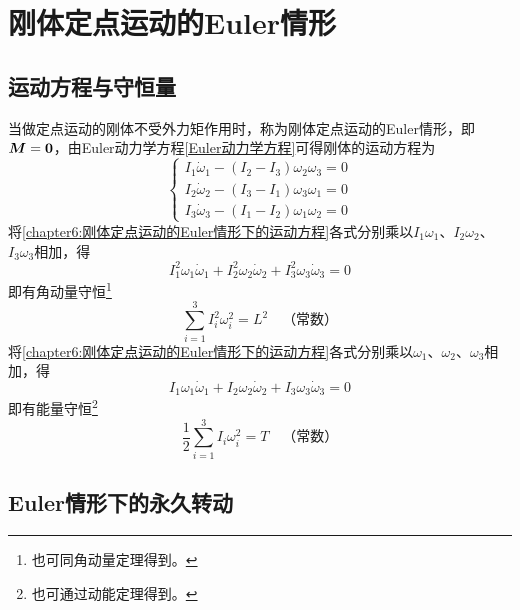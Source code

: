 \section{刚体定点运动的Euler情形}\label{chapter6:section-刚体定点运动的Euler情形}

\subsection{运动方程与守恒量}

当做定点运动的刚体不受外力矩作用时，称为刚体定点运动的{\heiti Euler情形}，即$\boldsymbol{M} = \boldsymbol{0}$，由Euler动力学方程\eqref{Euler动力学方程}可得刚体的运动方程为
\begin{equation}
	\begin{cases}
		I_1 \dot{\omega}_1 - (I_2-I_3)\omega_2 \omega_3 = 0 \\
		I_2 \dot{\omega}_2 - (I_3-I_1)\omega_3 \omega_1 = 0 \\
		I_3 \dot{\omega}_3 - (I_1-I_2)\omega_1 \omega_2 = 0
	\end{cases}
	\label{chapter6:刚体定点运动的Euler情形下的运动方程}
\end{equation}
将\eqref{chapter6:刚体定点运动的Euler情形下的运动方程}各式分别乘以$I_1\omega_1$、$I_2\omega_2$、$I_3\omega_3$相加，得
\begin{equation*}
	I_1^2 \omega_1 \dot{\omega}_1 + I_2^2 \omega_2 \dot{\omega}_2 + I_3^2 \omega_3 \dot{\omega}_3 = 0
\end{equation*}
即有角动量守恒\footnote{也可同角动量定理得到。}
\begin{equation}
	\sum_{i=1}^3 I_i^2 \omega_i^2 = L^2 \quad\text{（常数）}
	\label{chapter6:刚体定点运动的Euler情形下的角动量守恒}
\end{equation}
将\eqref{chapter6:刚体定点运动的Euler情形下的运动方程}各式分别乘以$\omega_1$、$\omega_2$、$\omega_3$相加，得
\begin{equation*}
	I_1 \omega_1 \dot{\omega}_1 + I_2 \omega_2 \dot{\omega}_2 + I_3 \omega_3 \dot{\omega}_3 = 0
\end{equation*}
即有能量守恒\footnote{也可通过动能定理得到。}
\begin{equation}
	\frac12 \sum_{i=1}^3 I_i \omega_i^2 = T \quad\text{（常数）}
	\label{chapter6:刚体定点运动的Euler情形下的能量守恒}
\end{equation}

\subsection{Euler情形下的永久转动}\label{chapter6:subsection-Euler情形下的永久转动}

